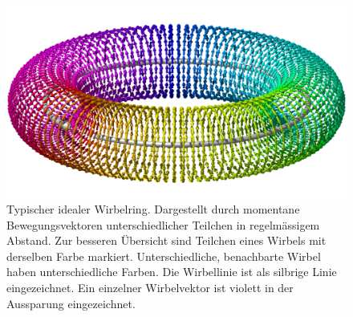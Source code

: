 \begin{figure}
\centering
\includegraphics[width=1\textwidth]{papers/wirbelringe/images/wirbelring.png}
\caption{Typischer idealer Wirbelring.
Dargestellt durch momentane Bewegungsvektoren unterschiedlicher Teilchen in regelmässigem Abstand.
Zur besseren Übersicht sind Teilchen eines Wirbels mit derselben Farbe markiert.
Unterschiedliche, benachbarte Wirbel haben unterschiedliche Farben.
Die Wirbellinie ist als silbrige Linie eingezeichnet.
Ein einzelner Wirbelvektor ist violett in der Aussparung eingezeichnet.\label{Wirbelringe:fig:generell}}
\end{figure}